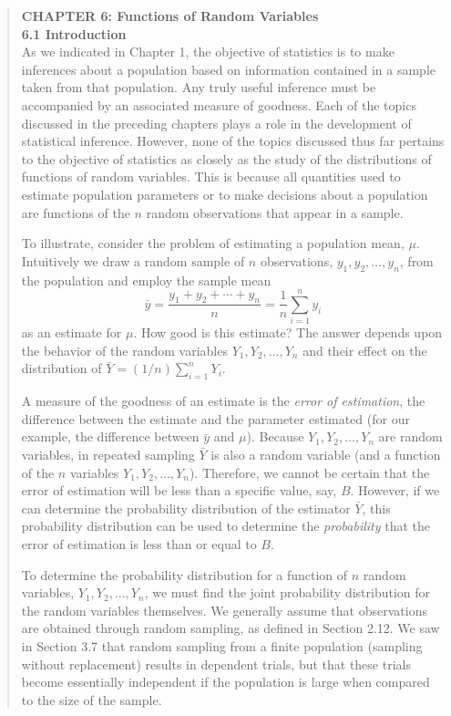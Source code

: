 \documentclass[11pt, letterpaper]{article}
\theoremstyle{definition}
\theoremstyle{remark}
\begin{document}
\begin{quote}
\textbf{CHAPTER 6: Functions of Random Variables} \\ \relax
\textbf{6.1 Introduction} \\ \relax
As we indicated in Chapter 1, the objective of statistics is to make inferences about a population based on information contained in a sample taken from that population. Any truly useful inference must be accompanied by an associated measure of goodness. Each of the topics discussed in the preceding chapters plays a role in the development of statistical inference. However, none of the topics discussed thus far pertains to the objective of statistics as closely as the study of the distributions of functions of random variables. This is because all quantities used to estimate population parameters or to make decisions about a population are functions of the $n$ random observations that appear in a sample.

To illustrate, consider the problem of estimating a population mean, $\mu$. Intuitively we draw a random sample of $n$ observations, $y_1, y_2, \dots, y_n$, from the population and employ the sample mean
\[
    \bar{y} = \frac{y_1 + y_2 + \cdots + y_n}{n} = \frac{1}{n} \sum_{i=1}^{n} y_i
\]
as an estimate for $\mu$. How good is this estimate? The answer depends upon the behavior of the random variables $Y_1, Y_2, \dots, Y_n$ and their effect on the distribution of $\bar{Y} = (1/n) \sum_{i=1}^{n} Y_i$.

A measure of the goodness of an estimate is the \emph{error of estimation}, the difference between the estimate and the parameter estimated (for our example, the difference between $\bar{y}$ and $\mu$). Because $Y_1, Y_2, \dots, Y_n$ are random variables, in repeated sampling $\bar{Y}$ is also a random variable (and a function of the $n$ variables $Y_1, Y_2, \dots, Y_n$). Therefore, we cannot be certain that the error of estimation will be less than a specific value, say, $B$. However, if we can determine the probability distribution of the estimator $\bar{Y}$, this probability distribution can be used to determine the \emph{probability} that the error of estimation is less than or equal to $B$.

To determine the probability distribution for a function of $n$ random variables, $Y_1, Y_2, \dots, Y_n$, we must find the joint probability distribution for the random variables themselves. We generally assume that observations are obtained through random sampling, as defined in Section 2.12. We saw in Section 3.7 that random sampling from a finite population (sampling without replacement) results in dependent trials, but that these trials become essentially independent if the population is large when compared to the size of the sample.


\end{quote}
\end{document}
